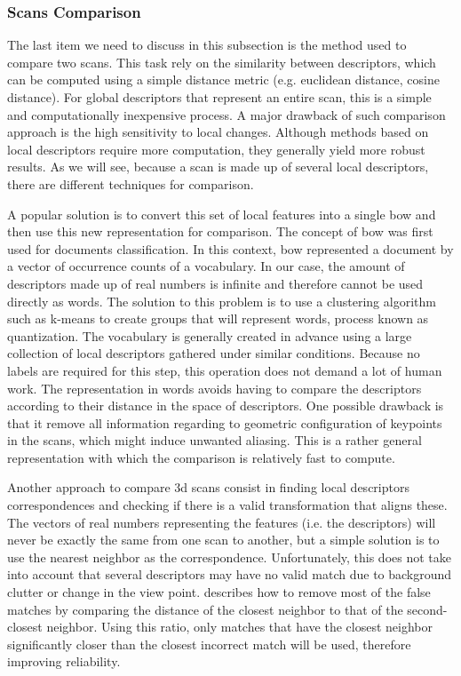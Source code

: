 \subsubsection{Scans Comparison}
\label{ssub:scans_comparison}

The last item we need to discuss in this subsection is the method used to compare two scans. This task rely on the similarity between descriptors, which can be computed using a simple distance metric (e.g. euclidean distance, cosine distance). For global descriptors that represent an entire scan, this is a simple and computationally inexpensive process. A major drawback of such comparison approach is the high sensitivity to local changes. Although methods based on local descriptors require more computation, they generally yield more robust results. As we will see, because a scan is made up of several local descriptors, there are different techniques for comparison.

A popular solution is to convert this set of local features into a single \gls*{bow} and then use this new representation for comparison. The concept of \gls*{bow} was first used for documents classification. In this context, \gls*{bow} represented a document by a vector of occurrence counts of a vocabulary. In our case, the amount of descriptors made up of real numbers is infinite and therefore cannot be used directly as words. The solution to this problem is to use a clustering algorithm such as k-means to create groups that will represent words, process known as quantization. The vocabulary is generally created in advance using a large collection of local descriptors gathered under similar conditions. Because no labels are required for this step, this operation does not demand a lot of human work. The representation in words avoids having to compare the descriptors according to their distance in the space of descriptors. One possible drawback is that it remove all information regarding to geometric configuration of keypoints in the scans, which might induce unwanted aliasing. This is a rather general representation with which the comparison is relatively fast to compute.

Another approach to compare \gls*{3d} scans consist in finding local descriptors correspondences and checking if there is a valid transformation that aligns these. The vectors of real numbers representing the features (i.e. the descriptors) will never be exactly the same from one scan to another, but a simple solution is to use the nearest neighbor as the correspondence. Unfortunately, this does not take into account that several descriptors may have no valid match due to background clutter or change in the view point. \cite[Section 7.1]{Lowe2004} describes how to remove most of the false matches by comparing the distance of the closest neighbor to that of the second-closest neighbor. Using this ratio, only matches that have the closest neighbor significantly closer than the closest incorrect match will be used, therefore improving reliability.

